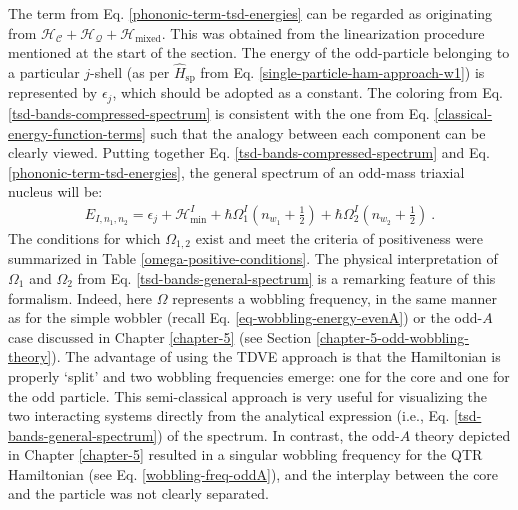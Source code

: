 The term from Eq. \ref{phononic-term-tsd-energies} can be regarded as originating from $\mathcal{H}_\mathscr{C}+\mathcal{H}_\mathcal{Q}+\mathcal{H}_\text{mixed}$. This was obtained from the linearization procedure mentioned at the start of the section. The energy of the odd-particle belonging to a particular $j$-shell (as per $\hat{H}_\text{sp}$ from Eq. \ref{single-particle-ham-approach-w1}) is represented by $\epsilon_j$, which should be adopted as a constant. The coloring from Eq. \ref{tsd-bands-compressed-spectrum} is consistent with the one from Eq. \ref{classical-energy-function-terms} such that the analogy between each component can be clearly viewed. Putting together Eq. \ref{tsd-bands-compressed-spectrum} and Eq. \ref{phononic-term-tsd-energies}, the general spectrum of an odd-mass triaxial nucleus will be:
\begin{align}
    E_{I,n_1,n_2}=\epsilon_j+\mathcal{H}_\text{min}^I+\hbar\Omega_1^I\left(n_{w_1}+\frac{1}{2}\right)+\hbar\Omega_2^I\left(n_{w_2}+\frac{1}{2}\right)\ .
    \label{tsd-bands-general-spectrum}
\end{align}
The conditions for which $\Omega_{1,2}$ exist and meet the criteria of positiveness were summarized in Table \ref{omega-positive-conditions}. The physical interpretation of $\Omega_1$ and $\Omega_2$ from Eq. \ref{tsd-bands-general-spectrum} is a remarking feature of this formalism. Indeed, here $\Omega$ represents a wobbling frequency, in the same manner as for the simple wobbler (recall Eq. \ref{eq-wobbling-energy-evenA}) or the odd-$A$ case discussed in Chapter \ref{chapter-5} (see Section \ref{chapter-5-odd-wobbling-theory}). The advantage of using the TDVE approach is that the Hamiltonian is properly `split' and two wobbling frequencies emerge: one for the core and one for the odd particle. This semi-classical approach is very useful for visualizing the two interacting systems directly from the analytical expression (i.e., Eq. \ref{tsd-bands-general-spectrum}) of the spectrum. In contrast, the odd-$A$ theory depicted in Chapter \ref{chapter-5} resulted in a singular wobbling frequency for the QTR Hamiltonian (see Eq. \ref{wobbling-freq-oddA}), and the interplay between the core and the particle was not clearly separated.


